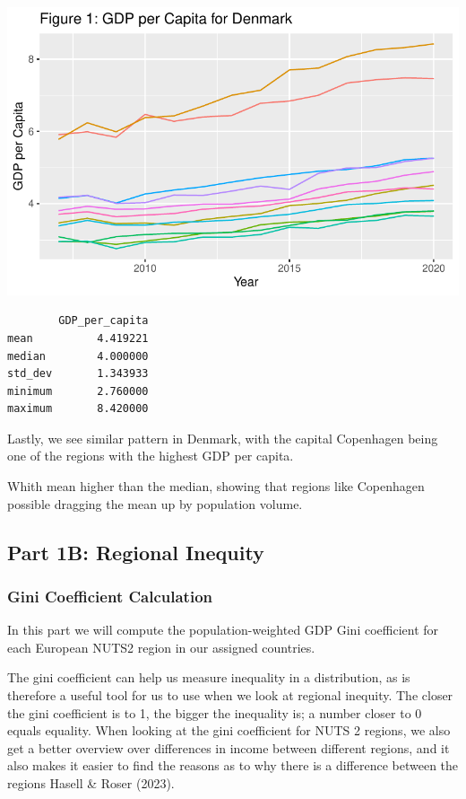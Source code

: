 \documentclass[
  a4paper,
  DIV=11,
  numbers=noendperiod]{scrartcl}
\begin{document}
\includegraphics{MSB104_GR_1_Final_Assignment_research_article_files/figure-pdf/unnamed-chunk-19-1.pdf}

\begin{verbatim}
        GDP_per_capita
mean          4.419221
median        4.000000
std_dev       1.343933
minimum       2.760000
maximum       8.420000
\end{verbatim}

Lastly, we see similar pattern in Denmark, with the capital Copenhagen
being one of the regions with the highest GDP per capita.

Whith mean higher than the median, showing that regions like Copenhagen
possible dragging the mean up by population volume.

\hypertarget{part-1b-regional-inequity}{%
\subsection{Part 1B: Regional
Inequity}\label{part-1b-regional-inequity}}

\hypertarget{gini-coefficient-calculation}{%
\subsubsection{Gini Coefficient
Calculation}\label{gini-coefficient-calculation}}

In this part we will compute the population-weighted GDP Gini
coefficient for each European NUTS2 region in our assigned countries.

The gini coefficient can help us measure inequality in a distribution,
as is therefore a useful tool for us to use when we look at regional
inequity. The closer the gini coefficient is to 1, the bigger the
inequality is; a number closer to 0 equals equality. When looking at the
gini coefficient for NUTS 2 regions, we also get a better overview over
differences in income between different regions, and it also makes it
easier to find the reasons as to why there is a difference between the
regions Hasell \& Roser (2023).
\end{document}
